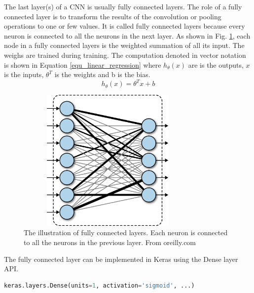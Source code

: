 The last layer(s) of a CNN is usually fully connected layers. The role of a fully connected layer is to transform the results of the convolution or pooling operations to one or few values. It is called fully connected layers because every neuron is connected to all the neurons in the next layer. As shown in Fig. \ref{fig_fc}, each node in a fully connected layers is the weighted summation of all its input. The weighs are trained during training. The computation denoted in vector notation is shown in Equation \ref{equ_linear_regression} where $h_\theta(x)$ are is the outputs, $x$ is the inputs, $\theta^T$ is the weights and b is the bias. 
\begin{equation}
h_\theta(x)=\theta^Tx + b \label{equ_linear_regression}
\end{equation}
\begin{figure}[h!]
\begin{center}
\includegraphics[height=7cm, width = 9cm]{img/fully_connected.png}
\caption{The illustration of fully connected layers. Each neuron is connected to all the neurons in the previous layer. From oreilly.com \label{fig_fc}}
\end{center}
\end{figure}

The fully connected layer can be implemented in Keras using the Dense layer API.
\begin{lstlisting}[language=python,frame=single]
keras.layers.Dense(units=1, activation='sigmoid', ...)
\end{lstlisting}
